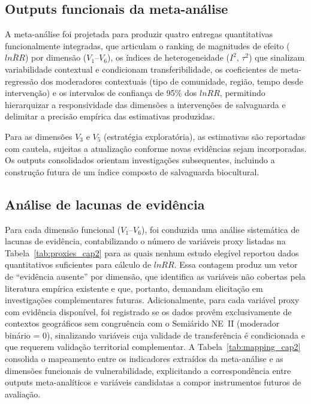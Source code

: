\subsection{Outputs funcionais da meta-análise}
\label{sec:outputs_cap2}

A meta-análise foi projetada para produzir quatro entregas quantitativas funcionalmente integradas, que articulam o ranking de magnitudes de efeito ($\overline{lnRR}$) por dimensão ($V_1$--$V_6$), os índices de heterogeneidade ($I^2$, $\tau^2$) que sinalizam variabilidade contextual e condicionam transferibilidade, os coeficientes de meta-regressão dos moderadores contextuais (tipo de comunidade, região, tempo desde intervenção) e os intervalos de confiança de 95\% dos $lnRR$, permitindo hierarquizar a responsividade das dimensões a intervenções de salvaguarda e delimitar a precisão empírica das estimativas produzidas.

Para as dimensões $V_3$ e $V_5$ (estratégia exploratória), as estimativas são reportadas com cautela, sujeitas a atualização conforme novas evidências sejam incorporadas. Os outputs consolidados orientam investigações subsequentes, incluindo a construção futura de um índice composto de salvaguarda biocultural.

\subsection{Análise de lacunas de evidência}
\label{sec:gaps_cap2}

Para cada dimensão funcional ($V_1$--$V_6$), foi conduzida uma análise sistemática de lacunas de evidência, contabilizando o número de variáveis proxy listadas na Tabela~\ref{tab:proxies_cap2} para as quais nenhum estudo elegível reportou dados quantitativos suficientes para cálculo de $lnRR$. Essa contagem produz um vetor de ``evidência ausente'' por dimensão, que identifica as variáveis não cobertas pela literatura empírica existente e que, portanto, demandam elicitação em investigações complementares futuras. Adicionalmente, para cada variável proxy com evidência disponível, foi registrado se os dados provêm exclusivamente de contextos geográficos sem congruência com o Semiárido NE~II (moderador binário = 0), sinalizando variáveis cuja validade de transferência é condicionada e que requerem validação territorial complementar. A Tabela~\ref{tab:mapping_cap2} consolida o mapeamento entre os indicadores extraídos da meta-análise e as dimensões funcionais de vulnerabilidade, explicitando a correspondência entre outputs meta-analíticos e variáveis candidatas a compor instrumentos futuros de avaliação.

